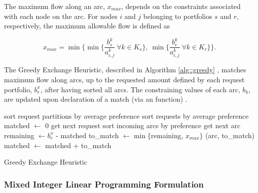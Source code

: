 The maximum flow along an arc, $x_{max}$, depends on the constraints associated
with each node on the arc. For nodes $i$ and $j$ belonging to portfolios $s$ and
$r$, respectively, the maximum allowable flow is defined as

\begin{equation}
  x_{max} = \min 
        \lbrace 
        \min \lbrace \frac{b^k_s}{a^k_{i, j}} 
        \: \forall k \in K_s \rbrace, 
        \: \min \lbrace \frac{b^k_r}{a^k_{i, j}} 
        \: \forall k \in K_r \rbrace
        \rbrace.
\end{equation}

The Greedy Exchange Heuristic, described in Algorithm \ref{alg::greedy} ,
matches maximum flow along arcs, up to the requested amount defined by each
request portfolio, $b^x_r$, after having sorted all arcs. The constraining values
of each arc, $b_k$, are updated upon declaration of a match (via an
 function) .

\begin{algorithm}[!h]
 \SetAlgoLined
 sort request partitions by average preference\;
  {
   sort requests by average preference\;
   matched $\leftarrow$ 0\;        
    {
     get next request\;
     sort incoming arcs by preference\;
      {
       get next arc\;
       remaining $\leftarrow b^x_r$ - matched\;
       to\_match $\leftarrow \min \lbrace$remaining, $x_{max} \rbrace$\;
       (arc, to\_match)\;
       matched $\leftarrow$ matched + to\_match\;
     }
   }
 }
 \caption{Greedy Exchange Heuristic}\label{alg::greedy}
\end{algorithm}


\subsubsection{Mixed Integer Linear Programming Formulation}\label{abm:dre:milp}


